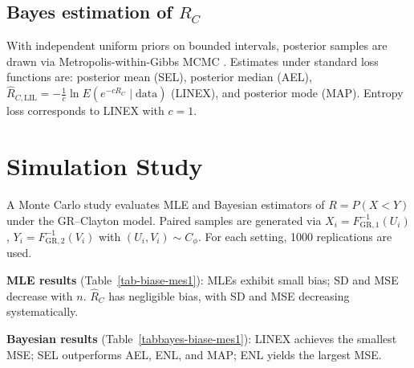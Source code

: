 \documentclass[twoside]{article}
\begin{document}
\subsection{Bayes estimation of \(R_C\)}

With independent uniform priors on bounded intervals, posterior samples are drawn via Metropolis-within-Gibbs MCMC \cite{Metropolis1953}. Estimates under standard loss functions are: posterior mean (SEL), posterior median (AEL), \(\widehat{R}_{C,\mathrm{LIL}} = -\frac{1}{c} \ln E(e^{-c R_C} \mid \text{data})\) (LINEX), and posterior mode (MAP). Entropy loss corresponds to LINEX with \(c = 1\).
\section{Simulation Study}

A Monte Carlo study evaluates MLE and Bayesian estimators of \(R = P(X < Y)\) under the GR--Clayton model. Paired samples are generated via \(X_i = F^{-1}_{\mathrm{GR},1}(U_i)\), \(Y_i = F^{-1}_{\mathrm{GR},2}(V_i)\) with \((U_i,V_i) \sim C_\phi\). For each setting, 1000 replications are used.

\vspace{0.1cm}
\noindent \textbf{MLE results} (Table~\ref{tab-biase-mes1}): MLEs exhibit small bias; SD and MSE decrease with \(n\). \(\widehat{R}_C\) has negligible bias, with SD and MSE decreasing systematically.

\vspace{0.1cm}
\noindent \textbf{Bayesian results} (Table~\ref{tabbayes-biase-mes1}): LINEX achieves the smallest MSE; SEL outperforms AEL, ENL, and MAP; ENL yields the largest MSE.
\end{document}
